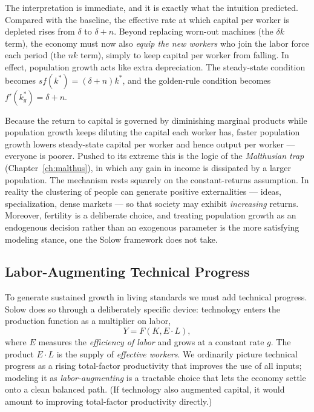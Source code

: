 The interpretation is immediate, and it is exactly what the intuition predicted. Compared with the baseline, the effective rate at which capital per worker is depleted rises from $\delta$ to $\delta + n$. Beyond replacing worn-out machines (the $\delta k$ term), the economy must now also \emph{equip the new workers} who join the labor force each period (the $n k$ term), simply to keep capital per worker from falling. In effect, population growth acts like extra depreciation. The steady-state condition becomes $s f(k^*) = (\delta + n) k^*$, and the golden-rule condition becomes $f'(k_g^*) = \delta + n$.

\begin{remark}
Because the return to capital is governed by diminishing marginal products while population growth keeps diluting the capital each worker has, faster population growth lowers steady-state capital per worker and hence output per worker --- everyone is poorer. Pushed to its extreme this is the logic of the \emph{Malthusian trap} (Chapter~\ref{ch:malthus}), in which any gain in income is dissipated by a larger population. The mechanism rests squarely on the constant-returns assumption. In reality the clustering of people can generate positive externalities --- ideas, specialization, dense markets --- so that society may exhibit \emph{increasing} returns. Moreover, fertility is a deliberate choice, and treating population growth as an endogenous decision rather than an exogenous parameter is the more satisfying modeling stance, one the Solow framework does not take.
\end{remark}

\subsection{Labor-Augmenting Technical Progress}

To generate sustained growth in living standards we must add technical progress. Solow does so through a deliberately specific device: technology enters the production function as a multiplier on labor,
\[
Y = F(K, E \cdot L),
\]
where $E$ measures the \emph{efficiency of labor} and grows at a constant rate $g$. The product $E \cdot L$ is the supply of \emph{effective workers}. We ordinarily picture technical progress as a rising total-factor productivity that improves the use of all inputs; modeling it as \emph{labor-augmenting} is a tractable choice that lets the economy settle onto a clean balanced path. (If technology also augmented capital, it would amount to improving total-factor productivity directly.)

